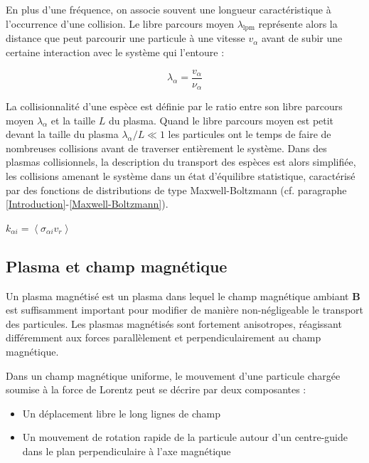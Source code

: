\begin{refsection}
En plus d'une fréquence, on associe souvent une longueur caractéristique
à l'occurrence d'une collision. Le libre parcours moyen $\lambda_\text{lpm}$
représente alors la distance que peut parcourir une particule à une vitesse
$v_\alpha$ avant de subir une certaine interaction avec le système qui l'entoure
:

\begin{equation}
	\lambda_\alpha=\frac{v_\alpha}{\nu_\alpha}
\end{equation} 

La collisionnalité d'une espèce est
définie par le ratio entre son libre parcours moyen $\lambda_\alpha$ et la
taille $L$ du plasma. Quand le libre parcours moyen est petit devant la
taille du plasma $\lambda_\alpha/L\ll 1$
les particules ont le temps de faire de nombreuses collisions avant de
traverser entièrement le système. Dans des plasmas collisionnels, la description
du transport des espèces est alors simplifiée, les collisions amenant le système dans un état
d'équilibre statistique, caractérisé par des fonctions de distributions de
type Maxwell-Boltzmann (cf. paragraphe \ref{Introduction}-\ref{Maxwell-Boltzmann}).


$k_{\alpha i}=\left<\sigma_{\alpha i} v_r\right>$
\subsection{Plasma et champ magnétique} 
\label{1-plasma-champMag}
Un plasma magnétisé est un plasma dans lequel le champ magnétique ambiant
$\mathbf{B}$ est suffisamment important pour modifier de manière non-négligeable
le transport des particules. Les plasmas magnétisés sont fortement
anisotropes, réagissant différemment aux forces parallèlement et
perpendiculairement au champ magnétique.

Dans un champ magnétique uniforme, le mouvement d'une particule chargée
soumise à la force de Lorentz peut se décrire par deux composantes :

\begin{itemize}
  \item Un déplacement libre le long lignes de champ
  \item Un mouvement de rotation rapide de la particule
  autour d'un centre-guide dans le plan perpendiculaire à l'axe magnétique
\end{itemize}


\end{refsection}
